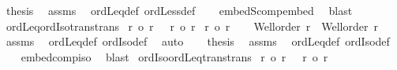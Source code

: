 \begin{isabellebody}
\ {\isacharquery}{\kern0pt}thesis\ \isamarkupfalse%
\ assms\ \isamarkupfalse%
\ ordLeq{\isacharunderscore}{\kern0pt}def\ ordLess{\isacharunderscore}{\kern0pt}def\isanewline
\ \ \isamarkupfalse%
\ embedS{\isacharunderscore}{\kern0pt}comp{\isacharunderscore}{\kern0pt}embed\ \isamarkupfalse%
\ blast\isanewline
{}\isamarkupfalse%
%
\endisatagproof
{\isafoldproof}%
%
\isadelimproof
\isanewline
%
\endisadelimproof
\isanewline
{}\isamarkupfalse%
\ ordLeq{\isacharunderscore}{\kern0pt}ordIso{\isacharunderscore}{\kern0pt}trans{\isacharbrackleft}{\kern0pt}trans{\isacharbrackright}{\kern0pt}{\isacharcolon}{\kern0pt}\isanewline
{}\ {\isachardoublequoteopen}r\ {\isasymle}o\ r{\isacharprime}{\kern0pt}{\isachardoublequoteclose}\ \ {\isachardoublequoteopen}\ r{\isacharprime}{\kern0pt}\ {\isacharequal}{\kern0pt}o\ r{\isacharprime}{\kern0pt}{\isacharprime}{\kern0pt}{\isachardoublequoteclose}\isanewline
{}\ {\isachardoublequoteopen}r\ {\isasymle}o\ r{\isacharprime}{\kern0pt}{\isacharprime}{\kern0pt}{\isachardoublequoteclose}\isanewline
%
\isadelimproof
%
\endisadelimproof
%
\isatagproof
{}\isamarkupfalse%
{\isacharminus}{\kern0pt}\isanewline
\ \ \isamarkupfalse%
\ {\isachardoublequoteopen}Well{\isacharunderscore}{\kern0pt}order\ r\ {\isasymand}\ Well{\isacharunderscore}{\kern0pt}order\ r{\isacharprime}{\kern0pt}{\isacharprime}{\kern0pt}{\isachardoublequoteclose}\isanewline
\ \ \isamarkupfalse%
\ assms\ \isamarkupfalse%
\ ordLeq{\isacharunderscore}{\kern0pt}def\ ordIso{\isacharunderscore}{\kern0pt}def\ \isamarkupfalse%
\ auto\isanewline
\ \ \isamarkupfalse%
\ {\isacharquery}{\kern0pt}thesis\ \isamarkupfalse%
\ assms\ \isamarkupfalse%
\ ordLeq{\isacharunderscore}{\kern0pt}def\ ordIso{\isacharunderscore}{\kern0pt}def\isanewline
\ \ \isamarkupfalse%
\ embed{\isacharunderscore}{\kern0pt}comp{\isacharunderscore}{\kern0pt}iso\ \isamarkupfalse%
\ blast\isanewline
{}\isamarkupfalse%
%
\endisatagproof
{\isafoldproof}%
%
\isadelimproof
\isanewline
%
\endisadelimproof
\isanewline
{}\isamarkupfalse%
\ ordIso{\isacharunderscore}{\kern0pt}ordLeq{\isacharunderscore}{\kern0pt}trans{\isacharbrackleft}{\kern0pt}trans{\isacharbrackright}{\kern0pt}{\isacharcolon}{\kern0pt}\isanewline
{}\ {\isachardoublequoteopen}r\ {\isacharequal}{\kern0pt}o\ r{\isacharprime}{\kern0pt}{\isachardoublequoteclose}\ \ {\isachardoublequoteopen}\ r{\isacharprime}{\kern0pt}\ {\isasymle}o\ r{\isacharprime}{\kern0pt}{\isacharprime}{\kern0pt}{\isachardoublequoteclose}\isanewline

\end{isabellebody}
